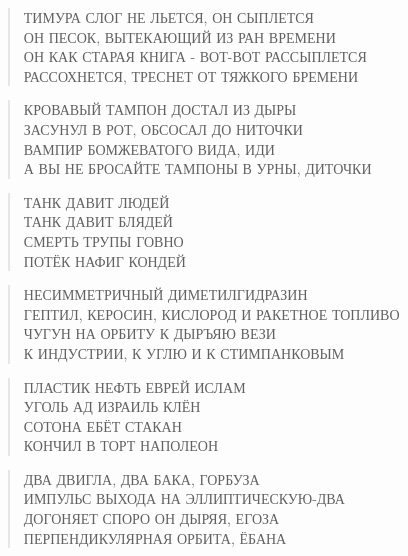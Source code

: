 \poemtitle{***}
\begin{verse}
ТИМУРА СЛОГ НЕ ЛЬЕТСЯ, ОН СЫПЛЕТСЯ\\
ОН ПЕСОК, ВЫТЕКАЮЩИЙ ИЗ РАН ВРЕМЕНИ\\
ОН КАК СТАРАЯ КНИГА - ВОТ-ВОТ РАССЫПЛЕТСЯ\\
РАССОХНЕТСЯ, ТРЕСНЕТ ОТ ТЯЖКОГО БРЕМЕНИ
\end{verse}

\poemtitle{***}
\begin{verse}
КРОВАВЫЙ ТАМПОН ДОСТАЛ ИЗ ДЫРЫ\\
ЗАСУНУЛ В РОТ, ОБСОСАЛ ДО НИТОЧКИ\\
ВАМПИР БОМЖЕВАТОГО ВИДА, ИДИ\\
А ВЫ НЕ БРОСАЙТЕ ТАМПОНЫ В УРНЫ, ДИТОЧКИ
\end{verse}

\poemtitle{***}
\begin{verse}
ТАНК ДАВИТ ЛЮДЕЙ\\
ТАНК ДАВИТ БЛЯДЕЙ\\
СМЕРТЬ ТРУПЫ ГОВНО\\
ПОТЁК НАФИГ КОНДЕЙ
\end{verse}

\poemtitle{***}
\begin{verse}
НЕСИММЕТРИЧНЫЙ ДИМЕТИЛГИДРАЗИН\\
ГЕПТИЛ, КЕРОСИН, КИСЛОРОД И РАКЕТНОЕ ТОПЛИВО\\
ЧУГУН НА ОРБИТУ К ДЫРЪЯЮ ВЕЗИ\\
К ИНДУСТРИИ, К УГЛЮ И К СТИМПАНКОВЫМ
\end{verse}

\poemtitle{***}
\begin{verse}
ПЛАСТИК НЕФТЬ ЕВРЕЙ ИСЛАМ\\
УГОЛЬ АД ИЗРАИЛЬ КЛЁН\\
СОТОНА ЕБЁТ СТАКАН\\
КОНЧИЛ В ТОРТ НАПОЛЕОН
\end{verse}

\poemtitle{***}
\begin{verse}
ДВА ДВИГЛА, ДВА БАКА, ГОРБУЗА\\
ИМПУЛЬС ВЫХОДА НА ЭЛЛИПТИЧЕСКУЮ-ДВА\\
ДОГОНЯЕТ СПОРО ОН ДЫРЯЯ, ЕГОЗА\\
ПЕРПЕНДИКУЛЯРНАЯ ОРБИТА, ЁБАНА
\end{verse}

